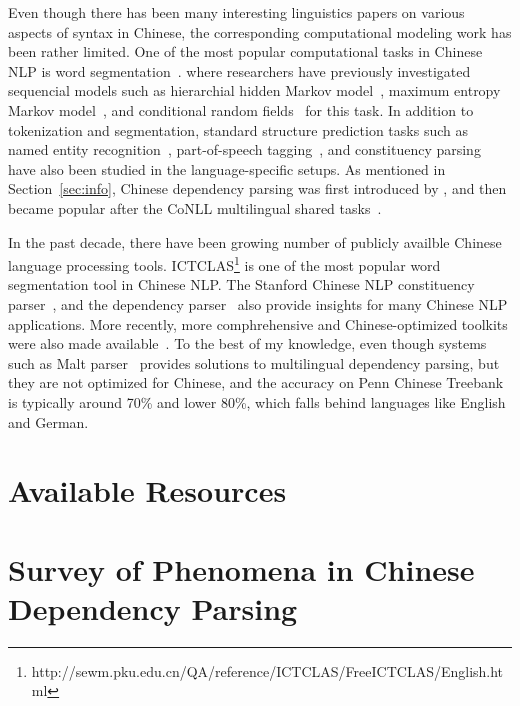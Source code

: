 \documentclass[11pt,letterpaper]{article}
\newcommand{\nascomment}[1]{\textcolor{blue}{\textbf{[#1 --NAS]}}}
\begin{document}
Even though there has been many interesting linguistics papers on various aspects
of syntax in Chinese, the corresponding computational modeling work has been rather limited.
One of the most popular computational tasks in Chinese NLP is word segmentation~\citep{xue2003chinese,sproat2003first}.
where researchers have previously investigated sequencial models such as
hierarchial hidden Markov model~\citep{zhang2003hhmm}, maximum entropy Markov model~\citep{xue2003chinese}, and conditional random fields~\citep{zhao2006improved} for this task.
In addition to tokenization and segmentation, standard structure prediction tasks such as 
named entity recognition~\citep{xue2003chinese,wu2005chinese}, part-of-speech tagging~\citep{ng2004chinese,jiang2008cascaded}, and constituency parsing~\citep{wu1997stochastic,wang2006fast}
have also been studied in the language-specific setups.
As mentioned in Section~\ref{sec:info}, Chinese dependency parsing was first introduced
by \cite{bikel2000two}, and then became popular after the CoNLL multilingual shared tasks~\citep{buchholz2006conll,nilsson2007conll}.

In the past decade, there have been growing number of publicly availble Chinese language processing tools.
ICTCLAS\footnote{http://sewm.pku.edu.cn/QA/reference/ICTCLAS/FreeICTCLAS/English.html} is one of the most popular word segmentation tool in Chinese NLP. The Stanford Chinese NLP constituency parser~\citep{levy2003harder},
and the dependency parser~\citep{chang2009discriminative} also provide insights for many Chinese NLP applications.
More recently, more comphrehensive and Chinese-optimized toolkits were also made available~\citep{qiu2013fudannlp,che2010ltp}.
To the best of my knowledge, even though systems such as Malt parser~\citep{nivre2007maltparser} provides solutions 
to multilingual dependency parsing, but they are not optimized for Chinese, and the accuracy on Penn Chinese Treebank is
typically around 70\% and lower 80\%, which falls behind languages like English and German.

\section{Available Resources}


\section{Survey of Phenomena in Chinese Dependency Parsing}
\end{document}
